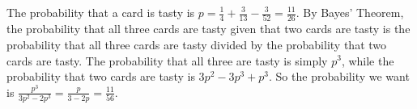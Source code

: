 The probability that a card is tasty is $p=\frac{1}{4}+\frac{3}{13}-\frac{3}{52}=\frac{11}{26}$. By Bayes' Theorem, the probability that all three cards are tasty given that two cards are tasty is the probability that all three cards are tasty divided by the probability that two cards are tasty. The probability that all three are tasty is simply $p^3$, while the probability that two cards are tasty is $3p^2-3p^3+p^3$. So the probability we want is $\frac{p^3}{3p^2-2p^3}=\frac{p}{3-2p}=\boxed{\frac{11}{56}}$.